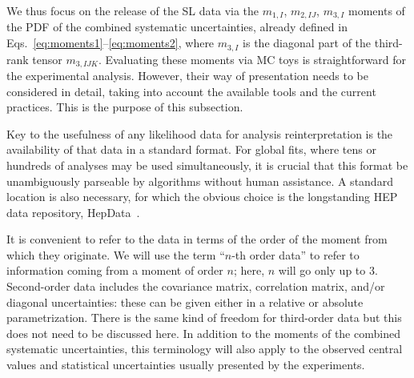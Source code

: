 \documentclass[11pt]{article}
\begin{document}
We thus focus on the release of the  SL data via the  $m_{1,I}$, $m_{2,IJ}$, $m_{3,I}$
moments   of the PDF of the combined systematic uncertainties,  already defined in Eqs.~\eqref{eq:moments1}--\eqref{eq:moments2}, where $m_{3,I}$ is the diagonal part of the third-rank tensor $m_{3,IJK}$.  Evaluating these moments via MC toys is straightforward for the experimental analysis. However, their way of presentation needs to be  
considered in detail, taking into account  the available tools and the current practices. This is the purpose of this subsection.



Key to the usefulness of any likelihood data for analysis reinterpretation is
the availability of that data in a standard format. For global fits, where tens
or hundreds of analyses may be used simultaneously, it is crucial that this
format be unambiguously parseable by algorithms without human assistance. A
standard location is also necessary, for which the obvious choice is the longstanding
HEP data repository, HepData~\cite{hepdata}.


It is convenient to refer to the data in terms of
the order of the moment from which they originate. We will use the term ``$n$-th
order data'' to refer to information coming from a moment of order $n$; here, $n$
will go only up to $3$. Second-order data includes the covariance matrix,
correlation matrix, and/or diagonal uncertainties: these can be given either in a
relative or absolute parametrization. There is the same kind of freedom for
third-order data but this does not need to be discussed here. In addition to the
moments of the combined systematic uncertainties, this terminology will also
apply to the observed central values and statistical uncertainties usually
presented by the experiments.
\end{document}
